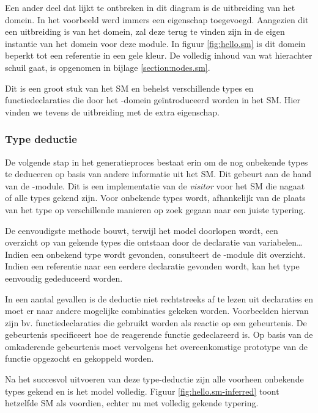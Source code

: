 Een ander deel dat lijkt te ontbreken in dit diagram is de uitbreiding van het
domein. In het voorbeeld werd immers een eigenschap  toegevoegd.
Aangezien dit een uitbreiding is van het domein, zal deze terug te vinden zijn
in de eigen instantie van het domein voor deze module. In figuur
\ref{fig:hello.sm} is dit domein beperkt tot een referentie in een gele kleur.
De volledig inhoud van wat hierachter schuil gaat, is opgenomen in bijlage
\ref{section:nodes.sm}.

Dit is een groot stuk van het SM en behelst verschillende types en
functiedeclaraties die door het -domein ge\"introduceerd worden in
het SM. Hier vinden we tevens de uitbreiding met de extra 
eigenschap.

\vspace{-3mm}

\subsubsection{Type deductie}

De volgende stap in het generatieproces bestaat erin om de nog onbekende types
te deduceren op basis van andere informatie uit het SM. Dit gebeurt aan de hand
van de -module. Dit is een implementatie van de \emph{visitor}
voor het SM die nagaat of alle types gekend zijn. Voor onbekende types wordt,
afhankelijk van de plaats van het type op verschillende manieren op zoek gegaan
naar een juiste typering.

De eenvoudigste methode bouwt, terwijl het model doorlopen wordt, een overzicht
op van gekende types die ontstaan door de declaratie van variabelen\dots Indien
een onbekend type wordt gevonden, consulteert de -module dit
overzicht. Indien een referentie naar een eerdere declaratie gevonden wordt,
kan het type eenvoudig gededuceerd worden.

In een aantal gevallen is de deductie niet rechtstreeks af te lezen uit
declaraties en moet er naar andere mogelijke combinaties gekeken worden.
Voorbeelden hiervan zijn bv. functiedeclaraties die gebruikt worden als reactie
op een gebeurtenis. De gebeurtenis specificeert hoe de reagerende functie
gedeclareerd is. Op basis van de omkaderende gebeurtenis moet vervolgens het
overeenkomstige prototype van de functie opgezocht en gekoppeld worden.

Na het succesvol uitvoeren van deze type-deductie zijn alle voorheen onbekende
types gekend en is het model volledig. Figuur \ref{fig:hello.sm-inferred} toont
hetzelfde SM als voordien, echter nu met volledig gekende typering.

